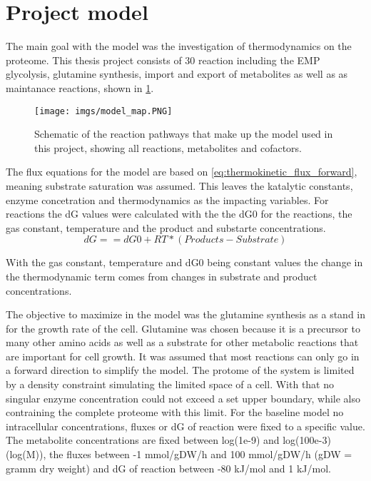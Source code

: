 \section{Project model}
The main goal with the model was the investigation of thermodynamics on the proteome. 
This thesis project consists of 30 reaction including the EMP glycolysis, glutamine synthesis, import and export of metabolites as well as as maintanace reactions, shown in \ref{fig:model_map}. 
\begin{figure}[H]
    \centering
    \texttt{[image: imgs/model\_map.PNG]}
    \caption{Schematic of the reaction pathways that make up the model used in this project, showing all reactions, metabolites and cofactors.}
    \label{fig:model_map}
\end{figure}

The flux equations for the model are based on \ref{eq:thermokinetic_flux_forward}, meaning substrate saturation was assumed. This leaves the katalytic constants, enzyme concetration and thermodynamics as the impacting variables.
For reactions the dG values were calculated with the the dG0 for the reactions, the gas constant, temperature and the product and substarte concentrations.
\begin{equation}
    dG == dG0 + RT * (Products - Substrate)
    \label{eq:general_dG}
\end{equation}

With the gas constant, temperature and dG0 being constant values the change in the thermodynamic term comes from changes in substrate and product concentrations. 

The objective to maximize in the model was the glutamine synthesis as a stand in for the growth rate of the cell. Glutamine was chosen because it is a precursor to many other amino acids as well as a substrate for other metabolic reactions that are important for cell growth.
It was assumed that most reactions can only go in a forward direction to simplify the model. 
The protome of the system is limited by a density constraint simulating the limited space of a cell. With that no singular enzyme concentration could not exceed a set upper boundary, while also contraining the complete proteome with this limit.
For the baseline model no intracellular concentrations, fluxes or dG of reaction were fixed to a specific value. The metabolite concentrations are fixed between log(1e-9) and log(100e-3) (log(M)), the fluxes between -1 mmol/gDW/h and 100 mmol/gDW/h (gDW = gramm dry weight) and dG of reaction between -80 kJ/mol and 1 kJ/mol. 

